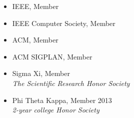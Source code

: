 \documentclass[11pt]{article}
\begin{document}
\begin{itemize}
\end{itemize}











\begin{itemize}
  \item {IEEE}, Member \hfill {}
  \item {IEEE Computer Society}, Member \hfill {}
  \item {ACM}, Member  \hfill {}
  \item {ACM SIGPLAN}, Member \hfill {}
  \item {Sigma Xi}, Member \hfill {}
    \\ \emph{The Scientific Research Honor Society}
  \item {Phi Theta Kappa}, Member \hfill 2013
    \\ \emph{2-year college Honor Society}
\end{itemize}
\end{document}
